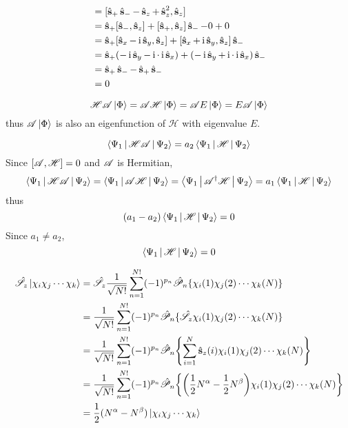 \documentclass[a4paper]{article}
\begin{document}
\begin{align}
[\hs^2, \hs_z] &= [\hs_+\hs_- - \hs_z + \hs_z^2, \hs_z] \notag\\
&= \hs_+[\hs_-, \hs_z] + [\hs_+, \hs_z]\hs_- - 0 + 0 \notag\\
&= \hs_+[\hs_x - \I\hs_y, \hs_z] + [\hs_x + \I\hs_y, \hs_z]\hs_- \notag\\
&= \hs_+(-\I\hs_y -\I\cdot\I\hs_x) + (-\I\hs_y + \I\cdot\I\hs_x)\hs_- \notag\\
&= \hs_+ \hs_- - \hs_+\hs_- \notag\\
&= 0
\end{align}

\begin{equation}\label{key}
\mathscr{H} \mathscr{A}\ket{\Phi} =  \mathscr{A}\mathscr{H} \ket{\Phi} =  \mathscr{A} E \ket{\Phi} = E\mathscr{A} \ket{\Phi}
\end{equation}
thus $ \mathscr{A} \ket{\Phi} $ is also an eigenfunction of $ \mathscr{H} $ with eigenvalue $ E $.

\begin{equation}\label{key}
\Braket{\Psi_1 | \mathscr{H} \mathscr{A} | \Psi_2} = a_2 \Braket{\Psi_1 | \operatorname{\mathscr{H}} | \Psi_2}
\end{equation}
Since $ [\operatorname{\mathscr{A}}, \operatorname{\mathscr{H}}]=0 $ and $ \operatorname{\mathscr{A}} $ is Hermitian,
\begin{equation}\label{key}
\Braket{\Psi_1 | \mathscr{H} \mathscr{A} | \Psi_2} = \Braket{\Psi_1 | \mathscr{A}\mathscr{H}  | \Psi_2} = \Braket{\Psi_1 | \mathscr{A}^\dagger \mathscr{H}  | \Psi_2} = a_1 \Braket{\Psi_1 | \mathscr{H} | \Psi_2}
\end{equation}
thus
\begin{equation}\label{key}
(a_1 - a_2) \Braket{\Psi_1 | \operatorname{\mathscr{H}} |\Psi_2} = 0
\end{equation}
Since $ a_1 \neq a_2 $,
\begin{equation}\label{key}
\Braket{\Psi_1 | \operatorname{\mathscr{H}} |\Psi_2} = 0
\end{equation}

\begin{align}
\hat{\mathscr{S}}_z \ket{\chi_i\chi_j\cdots\chi_k} &= \hat{\mathscr{S}}_z \dfrac{1}{\sqrt{N!}}\sum_{n=1}^{N!}(-1)^{p_n} \hat{\mathscr{P}}_n\{\chi_i(1)\chi_j(2)\cdots\chi_k(N)\} \notag\\
&= \dfrac{1}{\sqrt{N!}}\sum_{n=1}^{N!}(-1)^{p_n} \hat{\mathscr{P}}_n\{\hat{\mathscr{S}}_z \chi_i(1)\chi_j(2)\cdots\chi_k(N)\} \notag\\
&= \dfrac{1}{\sqrt{N!}}\sum_{n=1}^{N!}(-1)^{p_n} \hat{\mathscr{P}}_n\qty{\sum_{i=1}^{N} \operatorname{\hat{\vb{s}}}_z(i)\chi_i(1)\chi_j(2)\cdots\chi_k(N)} \notag\\
&= \dfrac{1}{\sqrt{N!}}\sum_{n=1}^{N!}(-1)^{p_n} \hat{\mathscr{P}}_n\qty{\qty(\dfrac{1}{2}N^\alpha - \dfrac{1}{2}N^\beta)\chi_i(1)\chi_j(2)\cdots\chi_k(N)} \notag\\
&= \dfrac{1}{2}(N^\alpha - N^\beta) \ket{\chi_i\chi_j\cdots\chi_k} 
\end{align}
\end{document}
